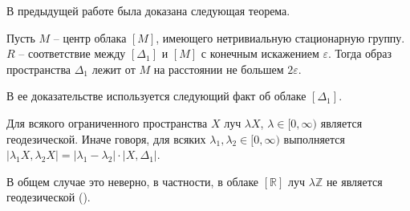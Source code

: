 В предыдущей работе была доказана следующая теорема.
\begin{thm}
	Пусть $M$ -- центр облака $[M]$, имеющего нетривиальную
	стационарную группу. $R$ -- соответствие между $[\Delta_{1}]$ и $[M]$ с конечным
	искажением $\varepsilon$. Тогда образ пространства $\Delta_{1}$ лежит от $M$ на
	расстоянии не большем $2 \varepsilon $.
	\label{thrmCenterImage}
\end{thm}
В ее доказательстве используется следующий факт об облаке \( [\Delta _1] \).
\begin{thm}
    Для всякого ограниченного пространства \( X \) луч \( \lambda X \), \(
    \lambda \in [0,\infty ) \) является геодезической. Иначе говоря, для всяких
    \( \lambda _1, \lambda _2 \in [0,\infty) \) выполняется \(| \lambda _1 X,
    \lambda _2 X| = | \lambda _1 - \lambda _2 | \cdot | X, \Delta _1 |\).
\end{thm}
В общем случае это неверно, в частности, в облаке \( [\mathbb{R}]
\) луч \( \lambda \mathbb{Z} \) не является геодезической
(\cite{mikhailov2025newgeodesiclinesgromovhausdorff}).
